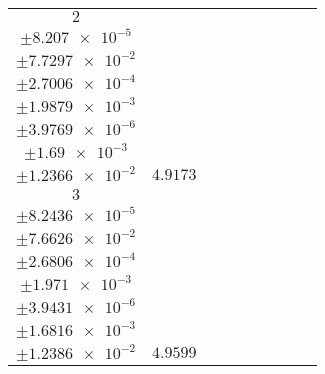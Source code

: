 \documentclass[8pt]{article}
\begin{document}
\begin{longtable}[l]{c c c c c c c c c}
$\num{2}$ & \begin{tabular}[c]{@{}c@{}}$\num{6.1176e-2}$ \\ $\pm\num{8.207e-5}$\end{tabular} & \begin{tabular}[c]{@{}c@{}}$\num{0.22815}$ \\ $\pm\num{7.7297e-2}$\end{tabular} & \begin{tabular}[c]{@{}c@{}}$\num{-4.4398}$ \\ $\pm\num{2.7006e-4}$\end{tabular} & \begin{tabular}[c]{@{}c@{}}$\num{1.3298e+3}$ \\ $\pm\num{1.9879e-3}$\end{tabular} & \begin{tabular}[c]{@{}c@{}}$\num{2.6604}$ \\ $\pm\num{3.9769e-6}$\end{tabular} & \begin{tabular}[c]{@{}c@{}}$\num{1.18}$ \\ $\pm\num{1.69e-3}$\end{tabular} & \begin{tabular}[c]{@{}c@{}}$\num{4.1457}$ \\ $\pm\num{1.2366e-2}$\end{tabular} & $\num{4.9173}$\\
$\num{3}$ & \begin{tabular}[c]{@{}c@{}}$\num{6.178e-2}$ \\ $\pm\num{8.2436e-5}$\end{tabular} & \begin{tabular}[c]{@{}c@{}}$\num{0.18298}$ \\ $\pm\num{7.6626e-2}$\end{tabular} & \begin{tabular}[c]{@{}c@{}}$\num{4.4379}$ \\ $\pm\num{2.6806e-4}$\end{tabular} & \begin{tabular}[c]{@{}c@{}}$\num{1.3387e+3}$ \\ $\pm\num{1.971e-3}$\end{tabular} & \begin{tabular}[c]{@{}c@{}}$\num{2.6782}$ \\ $\pm\num{3.9431e-6}$\end{tabular} & \begin{tabular}[c]{@{}c@{}}$\num{1.179}$ \\ $\pm\num{1.6816e-3}$\end{tabular} & \begin{tabular}[c]{@{}c@{}}$\num{4.2097}$ \\ $\pm\num{1.2386e-2}$\end{tabular} & $\num{4.9599}$\\

\end{longtable}
\end{document}
